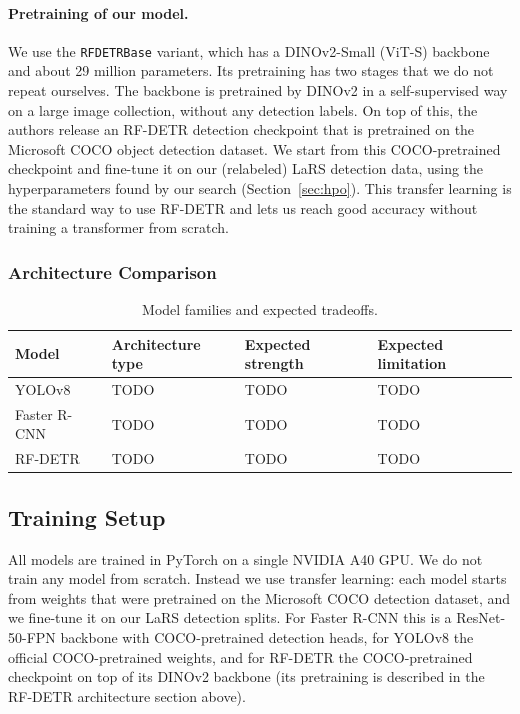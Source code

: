 \documentclass[11pt,a4paper]{article}
\begin{document}
\paragraph{Pretraining of our model.}
We use the \texttt{RFDETRBase} variant, which has a DINOv2-Small (ViT-S) backbone
and about 29 million parameters. Its pretraining has two stages that we do not
repeat ourselves. The backbone is pretrained by DINOv2 in a self-supervised way
on a large image collection, without any detection labels. On top of this, the
authors release an RF-DETR detection checkpoint that is pretrained on the
Microsoft COCO object detection dataset. We start from this COCO-pretrained
checkpoint and fine-tune it on our (relabeled) LaRS detection data, using the
hyperparameters found by our search (Section~\ref{sec:hpo}). This transfer
learning is the standard way to use RF-DETR and lets us reach good accuracy
without training a transformer from scratch.

\subsubsection{Architecture Comparison}

\begin{table}[H]
    \centering
    \caption{Model families and expected tradeoffs.}
    \label{tab:model_overview}
    \begin{tabular}{llll}
        \toprule
        Model & Architecture type & Expected strength & Expected limitation \\
        \midrule
        YOLOv8 & TODO & TODO & TODO \\
        Faster R-CNN & TODO & TODO & TODO \\
        RF-DETR & TODO & TODO & TODO \\
        \bottomrule
    \end{tabular}
\end{table}

\subsection{Training Setup}
All models are trained in PyTorch on a single NVIDIA A40 GPU. We do not train
any model from scratch. Instead we use transfer learning: each model starts from
weights that were pretrained on the Microsoft COCO detection dataset, and we
fine-tune it on our LaRS detection splits. For Faster R-CNN this is a
ResNet-50-FPN backbone with COCO-pretrained detection heads, for YOLOv8 the
official COCO-pretrained weights, and for RF-DETR the COCO-pretrained checkpoint
on top of its DINOv2 backbone (its pretraining is described in the RF-DETR
architecture section above).
\end{document}
